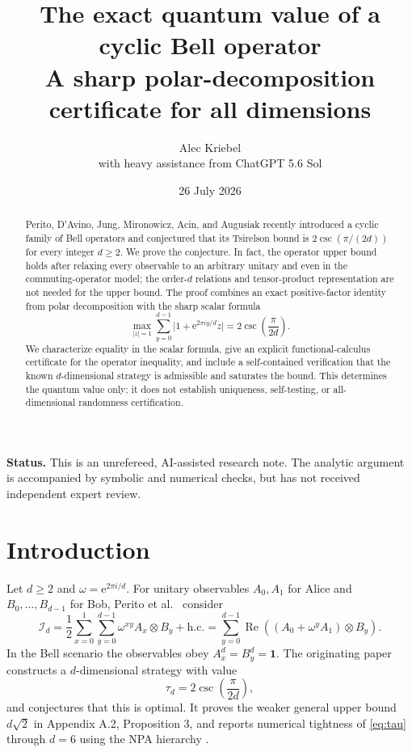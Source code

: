 \documentclass[11pt]{article}
\title{\vspace{-1.4cm}\textbf{The exact quantum value of a cyclic Bell operator}\\[0.45em]
\large A sharp polar-decomposition certificate for all dimensions}
\author{Alec Kriebel\\
\small with heavy assistance from ChatGPT 5.6 Sol}
\date{26 July 2026}
\theoremstyle{remark}
\newcommand{\Id}{\mathbf 1}
\newcommand{\cI}{\mathcal I}
\newcommand{\Reop}{\operatorname{Re}}
\newcommand{\e}{\mathrm e}
\begin{document}
\maketitle

\begin{abstract}
Perito, D'Avino, Jung, Mironowicz, Acin, and Augusiak recently
introduced a cyclic family of Bell operators and conjectured that its
Tsirelson bound is
\(
2\csc(\pi/(2d))
\)
for every integer \(d\geq2\).  We prove the conjecture.  In fact, the
operator upper bound holds after relaxing every observable to an arbitrary
unitary and even in the commuting-operator model; the order-\(d\) relations
and tensor-product representation are not needed for the upper bound.  The
proof combines an exact positive-factor identity from polar decomposition with
the sharp scalar formula
\[
  \max_{\lvert z\rvert=1}\sum_{y=0}^{d-1}\lvert1+\e^{2\pi i y/d}z\rvert
  =2\csc\!\left(\frac{\pi}{2d}\right).
\]
We characterize equality in the scalar formula, give an explicit
functional-calculus certificate for the operator inequality, and include a
self-contained verification that the known \(d\)-dimensional strategy is
admissible and saturates the bound.  This determines the quantum value only;
it does not establish uniqueness, self-testing, or all-dimensional
randomness certification.
\end{abstract}

\medskip
\noindent\textbf{Status.}
This is an unrefereed, AI-assisted research note.  The analytic argument is
accompanied by symbolic and numerical checks, but has not received independent
expert review.

\section{Introduction}

Let \(d\geq2\) and \(\omega=\e^{2\pi i/d}\).  For unitary observables
\(A_0,A_1\) for Alice and \(B_0,\ldots,B_{d-1}\) for Bob, Perito et
al.~\cite{PeritoEtAl2026} consider
\begin{equation}
  \cI_d
  =
  \frac12\sum_{x=0}^{1}\sum_{y=0}^{d-1}
       \omega^{xy} A_x\otimes B_y+\mathrm{h.c.}
  =
  \sum_{y=0}^{d-1}
       \Reop\!\left((A_0+\omega^yA_1)\otimes B_y\right).
  \label{eq:bell}
\end{equation}
In the Bell scenario the observables obey
\(
A_x^d=B_y^d=\Id
\).
The originating paper constructs a \(d\)-dimensional strategy with value
\begin{equation}
  \tau_d=2\csc\!\left(\frac{\pi}{2d}\right),
  \label{eq:tau}
\end{equation}
and conjectures that this is optimal.  It proves the weaker general upper
bound \(d\sqrt2\) in Appendix A.2, Proposition 3, and reports numerical
tightness of \eqref{eq:tau} through \(d=6\) using the NPA hierarchy
\cite{NPA2007,NPA2008}.
\end{document}
